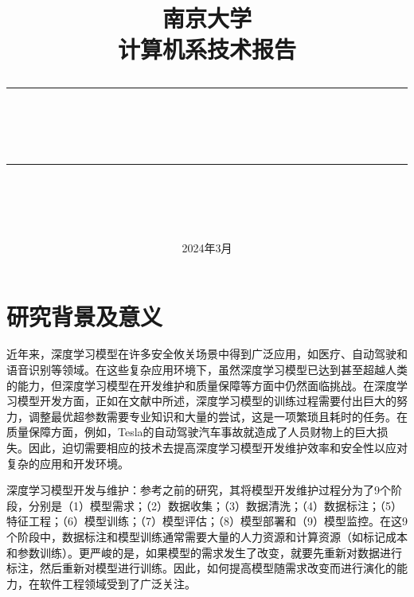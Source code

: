 \documentclass[fontset=macnew,UTF8]{article} %
\newcommand{\horrule}[1]{\rule[0.5ex]{\linewidth}{#1}} 	%
\begin{document}
\title{
{\textsc{
南京大学\\
计算机系技术报告 \\[150pt]}}
\horrule{2.5pt}\\
\horrule{1.8pt}\\[150pt]
}
\date{2024年3月} %

\begin{titlepage}
\maketitle
\vspace{30pt}
\thispagestyle{empty}
\end{titlepage}

\tableofcontents
\thispagestyle{empty}

\newpage
\setcounter{page}{1}

\section{研究背景及意义}
近年来，深度学习模型在许多安全攸关场景中得到广泛应用，如医疗\cite{medical}、自动驾驶\cite{self_Driving}和语音识别\cite{speech_recognition}等领域。在这些复杂应用环境下，虽然深度学习模型已达到甚至超越人类的能力，但深度学习模型在开发维护\cite{menghani2023efficient}和质量保障\cite{chakraborty2019software}等方面中仍然面临挑战。在深度学习模型开发方面，正如在文献\cite{mohammed2023comprehensive}中所述，深度学习模型的训练过程需要付出巨大的努力，调整最优超参数需要专业知识和大量的尝试，这是一项繁琐且耗时的任务。在质量保障方面，例如，Tesla的自动驾驶汽车事故就造成了人员财物上的巨大损失\cite{Tesla}。因此，迫切需要相应的技术去提高深度学习模型开发维护效率和安全性以应对复杂的应用和开发环境。

深度学习模型开发与维护：参考之前的研究\cite{amershi2019software}，其将模型开发维护过程分为了9个阶段，分别是（1）模型需求；（2）数据收集；（3）数据清洗；（4）数据标注；（5）特征工程；（6）模型训练；（7）模型评估；（8）模型部署和（9）模型监控。在这9个阶段中，数据标注和模型训练通常需要大量的人力资源和计算资源（如标记成本和参数训练）。更严峻的是，如果模型的需求发生了改变，就要先重新对数据进行标注，然后重新对模型进行训练。因此，如何提高模型随需求改变而进行演化的能力，在软件工程领域受到了广泛关注。
\end{document}
